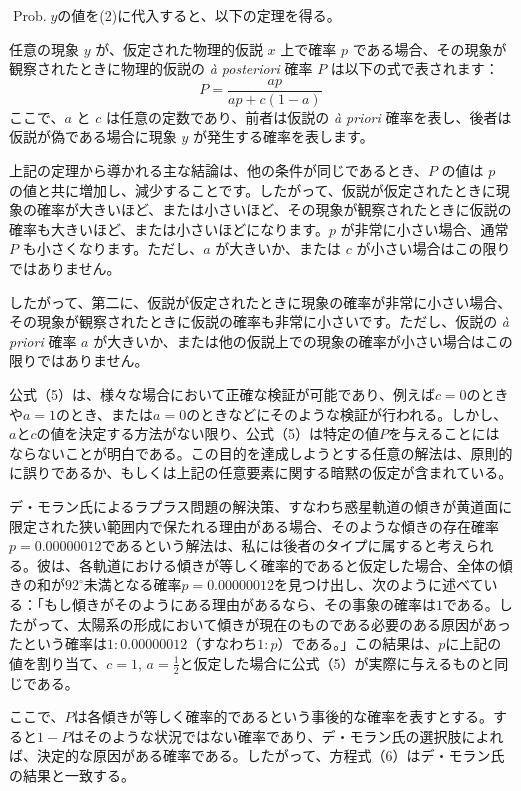 \documentclass[a4paper,11pt,openany]{ltjsbook}
\begin{document}
$\operatorname{Prob. } y$の値を(2)に代入すると、以下の定理を得る。

任意の現象 \( y \) が、仮定された物理的仮説 \( x \) 上で確率 \( p \) である場合、その現象が観察されたときに物理的仮説の \textit{\`{a} posteriori} 確率 \( P \) は以下の式で表されます：
\[
P = \frac{ap}{ap + c(1 - a)}
\]
ここで、\( a \) と \( c \) は任意の定数であり、前者は仮説の \textit{\`{a} priori} 確率を表し、後者は仮説が偽である場合に現象 \( y \) が発生する確率を表します。

上記の定理から導かれる主な結論は、他の条件が同じであるとき、\( P \) の値は \( p \) の値と共に増加し、減少することです。したがって、仮説が仮定されたときに現象の確率が大きいほど、または小さいほど、その現象が観察されたときに仮説の確率も大きいほど、または小さいほどになります。\( p \) が非常に小さい場合、通常 \( P \) も小さくなります。ただし、\( a \) が大きいか、または \( c \) が小さい場合はこの限りではありません。

したがって、第二に、仮説が仮定されたときに現象の確率が非常に小さい場合、その現象が観察されたときに仮説の確率も非常に小さいです。ただし、仮説の \textit{\`{a} priori} 確率 \( a \) が大きいか、または他の仮説上での現象の確率が小さい場合はこの限りではありません。

公式（5）は、様々な場合において正確な検証が可能であり、例えば$c = 0$のときや$a = 1$のとき、または$a = 0$のときなどにそのような検証が行われる。しかし、$a$と$c$の値を決定する方法がない限り、公式（5）は特定の値$P$を与えることにはならないことが明白である。この目的を達成しようとする任意の解法は、原則的に誤りであるか、もしくは上記の任意要素に関する暗黙の仮定が含まれている。

デ・モラン氏によるラプラス問題の解決策、すなわち惑星軌道の傾きが黄道面に限定された狭い範囲内で保たれる理由がある場合、そのような傾きの存在確率$p = 0.00000012$であるという解法は、私には後者のタイプに属すると考えられる。彼は、各軌道における傾きが等しく確率的であると仮定した場合、全体の傾きの和が$92^\circ$未満となる確率$p = 0.00000012$を見つけ出し、次のように述べている：「もし傾きがそのようにある理由があるなら、その事象の確率は$1$である。したがって、太陽系の形成において傾きが現在のものである必要のある原因があったという確率は$1 \colon 0.00000012$（すなわち$1 \colon p$）である。」この結果は、$p$に上記の値を割り当て、$c = 1$, $a = \frac{1}{2}$と仮定した場合に公式（5）が実際に与えるものと同じである。

ここで、$P$は各傾きが等しく確率的であるという事後的な確率を表すとする。すると$1 - P$はそのような状況ではない確率であり、デ・モラン氏の選択肢によれば、決定的な原因がある確率である。したがって、方程式（6）はデ・モラン氏の結果と一致する。
\end{document}
